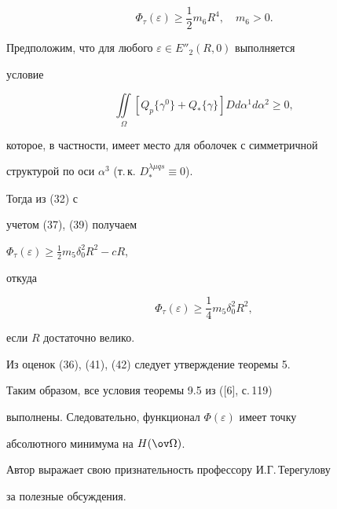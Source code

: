 \begin{pf}
\begin{equation} 


\Phi_\tau(\varepsilon)\ge\frac{1}{2}m_6R^4,\quad m_6>0 .


\end{equation} 


 


Предположим, что для любого $\varepsilon\in E''_2(R,0)$ выполняется 


условие 


$$ 


\iint\limits_\Omega[Q_p\{\gamma^0\}+Q_*\{\gamma\}] 


D d\alpha^1d\alpha^2\ge0, 


$$ 


которое, в частности, имеет место для оболочек с симметричной 


структурой по оси $\alpha^3$ (т.\,к. $D_*^{\lambda\mu q s}\equiv0$). 


Тогда из (32) с 


учетом (37), (39) получаем 


$\Phi_\tau(\varepsilon)\ge\frac{1}{2}m_5\delta^2_0R^2-c R$, 


откуда 


\begin{equation} 


\Phi_\tau(\varepsilon)\ge\frac{1}{4}m_5\delta^2_0R^2, 


\end{equation} 


если $R$ достаточно велико. 


Из оценок (36), (41), (42) следует утверждение теоремы 5. 


\end{pf} 


 


Таким образом, все условия теоремы 9.5 из ([6], с.\,119) 


выполнены. Следовательно, функционал $\Phi(\varepsilon)$ имеет точку 


абсолютного минимума на $H(\ov\Omega)$. 


 


Автор выражает свою признательность профессору И.Г.\,Терегулову 


за полезные обсуждения. 


 


